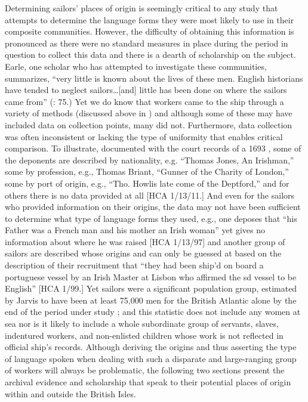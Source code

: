   Determining sailors’ places of origin is seemingly critical to any study that attempts to determine the language forms they were most likely to use in their composite communities. However, the difficulty of obtaining this information is pronounced as there were no standard measures in place during the period in question to collect this data and there is a dearth of scholarship on the subject. Earle, one scholar who has attempted to investigate these communities, summarizes, “very little is known about the lives of these men. English historians have tended to neglect sailors…[and] little has been done on where the sailors came from” (\citeyear*{Earle1993}: 75.) Yet we do know that workers came to the ship through a variety of methods (discussed above in ) and although some of these may have included data on collection points, many did not. Furthermore, data collection was often inconsistent or lacking the type of uniformity that enables critical comparison. To illustrate, documented with the court records of a 1693 , some of the deponents are described by nationality, e.g. “Thomas Jones, An Irishman,” some by profession, e.g., Thomas Briant, “Gunner of the Charity of London,” some by port of origin, e.g., “Tho. Howlis late come of the Deptford,” and for others there is no data provided at all [HCA 1/13/11.] And even for the sailors who provided information on their origins, the data may not have been sufficient to determine what type of language forms they used, e.g., one  deposes that “his Father was a French man and his mother an Irish woman” yet gives no information about where he was raised [HCA 1/13/97] and another group of sailors are described whose origins and  can only be guessed at based on the description of their recruitment that “they had been ship’d on board a portuguese vessel by an Irish Master at Lisbon who affirmed the sd vessel to be English” [HCA 1/99.] Yet sailors were a significant population group, estimated by Jarvis to have been at least 75,000 men for the British Atlantic alone by the end of the period under study \citep[252]{Jarvis2010}; and this statistic does not include any women at sea nor is it likely to include a whole subordinate group of servants, slaves, indentured workers, and non-enlisted children whose work is not reflected in official ship’s records. Although deriving the origins and thus asserting the type of language spoken when dealing with such a disparate and large-ranging group of workers will always be problematic, the following two sections present the archival evidence and scholarship that speak to their potential places of origin within and outside the British Isles.


